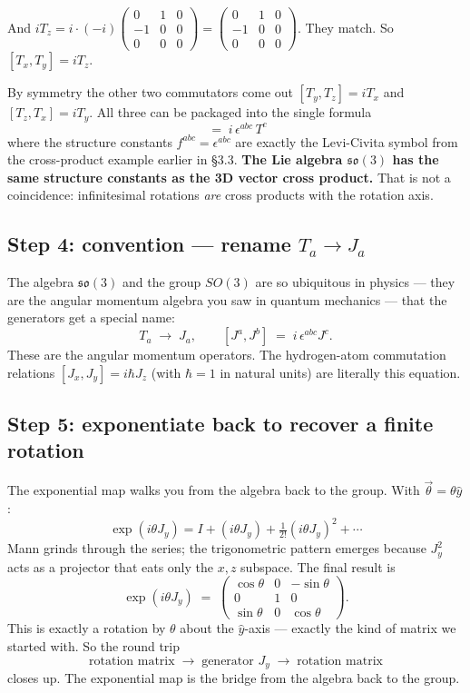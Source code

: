\documentclass[11pt]{article}
\begin{document}
And $i T_z = i \cdot (-i)\begin{pmatrix} 0 & 1 & 0 \\ -1 & 0 & 0 \\
0 & 0 & 0 \end{pmatrix} = \begin{pmatrix} 0 & 1 & 0 \\ -1 & 0 & 0 \\
0 & 0 & 0 \end{pmatrix}$. They match. So $[T_x, T_y] = i T_z$.

By symmetry the other two commutators come out $[T_y, T_z] = i T_x$ and
$[T_z, T_x] = i T_y$. All three can be packaged into the single formula
\begin{equation}
  [T^a, T^b] \;=\; i\, \epsilon^{abc}\, T^c
  \tag{3.10}
\end{equation}
where the structure constants $f^{abc} = \epsilon^{abc}$ are exactly the
Levi-Civita symbol from the cross-product example earlier in \S3.3.
\textbf{The Lie algebra $\mathfrak{so}(3)$ has the same structure
constants as the 3D vector cross product.} That is not a coincidence:
infinitesimal rotations \emph{are} cross products with the rotation
axis.

\subsection*{Step 4: convention --- rename $T_a \to J_a$}

The algebra $\mathfrak{so}(3)$ and the group $SO(3)$ are so ubiquitous
in physics --- they are the angular momentum algebra you saw in quantum
mechanics --- that the generators get a special name:
\[
  T_a \;\longrightarrow\; J_a, \qquad [J^a, J^b] \;=\; i\,\epsilon^{abc} J^c.
  \tag{3.13}
\]
These are the angular momentum operators. The hydrogen-atom commutation
relations $[J_x, J_y] = i\hbar J_z$ (with $\hbar = 1$ in natural units)
are literally this equation.

\subsection*{Step 5: exponentiate back to recover a finite rotation}

The exponential map walks you from the algebra back to the group. With
$\vec\theta = \theta \hat y$:
\[
  \exp(i\theta J_y)
  = I + (i\theta J_y) + \tfrac{1}{2!}(i\theta J_y)^2 + \cdots
\]
Mann grinds through the series; the trigonometric pattern emerges
because $J_y^2$ acts as a projector that eats only the $x,z$ subspace.
The final result is
\[
  \exp(i\theta J_y) \;=\;
  \begin{pmatrix} \cos\theta & 0 & -\sin\theta \\
                  0 & 1 & 0 \\
                  \sin\theta & 0 & \cos\theta \end{pmatrix}.
  \tag{3.17}
\]
This is exactly a rotation by $\theta$ about the $\hat y$-axis ---
exactly the kind of matrix we started with. So the round trip
\[
  \text{rotation matrix} \;\to\; \text{generator $J_y$}
  \;\to\; \text{rotation matrix}
\]
closes up. The exponential map is the bridge from the algebra back to
the group.
\end{document}
